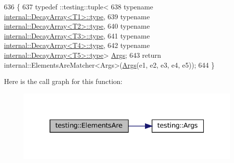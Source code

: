 \begin{DoxyCode}
636                   \{
637   typedef ::testing::tuple<
638       \textcolor{keyword}{typename} \hyperlink{namespacegenerate__debs_a50bc9a7ecac9584553e089a448bcde58}{internal::DecayArray<T1>::type},
639       \textcolor{keyword}{typename} \hyperlink{namespacegenerate__debs_a50bc9a7ecac9584553e089a448bcde58}{internal::DecayArray<T2>::type},
640       \textcolor{keyword}{typename} \hyperlink{namespacegenerate__debs_a50bc9a7ecac9584553e089a448bcde58}{internal::DecayArray<T3>::type},
641       \textcolor{keyword}{typename} \hyperlink{namespacegenerate__debs_a50bc9a7ecac9584553e089a448bcde58}{internal::DecayArray<T4>::type},
642       \textcolor{keyword}{typename} \hyperlink{namespacegenerate__debs_a50bc9a7ecac9584553e089a448bcde58}{internal::DecayArray<T5>::type}> 
      \hyperlink{namespacetesting_a09ac462e8d6ed468cbfaa9c767aee0aa}{Args};
643   \textcolor{keywordflow}{return} internal::ElementsAreMatcher<Args>(\hyperlink{namespacetesting_a09ac462e8d6ed468cbfaa9c767aee0aa}{Args}(e1, e2, e3, e4, e5));
644 \}
\end{DoxyCode}
Here is the call graph for this function\+:
\nopagebreak
\begin{figure}[H]
\begin{center}
\leavevmode
\includegraphics[width=313pt]{namespacetesting_aa075d52e84310659ca8636c6e7d5c9b2_cgraph}
\end{center}
\end{figure}
\mbox{\label{namespacetesting_a725b7a52e5eea9fe8f4ce46be6fd7159}} 
